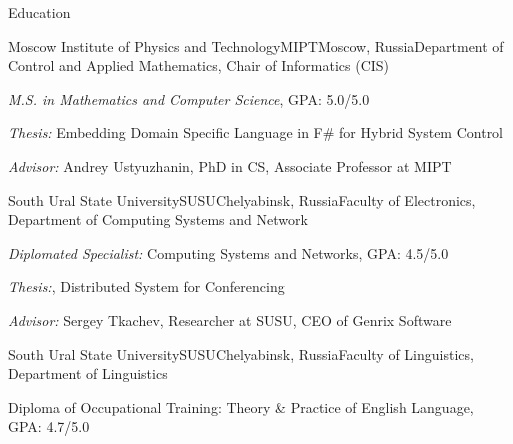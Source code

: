 \documentclass{resume} %
\begin{document}

\begin{rSection}{Education}

\begin{comment}

\begin{rSubsectionEducation}{Keldysh Institute of Applied Mathematics}{KIAM}{Moscow,
Russia}{Program Analysis and Transformation Group}
\item Theoretical Computer Science (2nd year PhD-dropout)
\end{rSubsectionEducation}

\end{comment}


\begin{rSubsectionEducation}{Moscow Institute of Physics and Technology}{MIPT}{Moscow, Russia}{Department of Control and Applied Mathematics, Chair of Informatics (CIS)}
\item \textit{M.S. in Mathematics and Computer Science}, GPA: 5.0/5.0
\item \textit{Thesis:} Embedding Domain Specific Language in F\# for Hybrid System Control
\item \textit{Advisor:} Andrey Ustyuzhanin, PhD in CS, Associate Professor at MIPT
\end{rSubsectionEducation}


\begin{rSubsectionEducation}{South Ural State University}{SUSU}{Chelyabinsk, Russia}{Faculty of Electronics, Department of Computing Systems and Network}
\item \textit{Diplomated Specialist:} Computing Systems and Networks, GPA: 4.5/5.0
\item \textit{Thesis:}, Distributed System for Conferencing
\item \textit{Advisor:} Sergey Tkachev, Researcher at SUSU, CEO of Genrix Software
\end{rSubsectionEducation}


\begin{rSubsectionEducation}{South Ural State University}{SUSU}{Chelyabinsk, Russia}{Faculty of Linguistics, Department of Linguistics}
\item Diploma of Occupational Training: Theory \& Practice of English Language, GPA: 4.7/5.0
\end{rSubsectionEducation}


\end{rSection}
\end{document}
